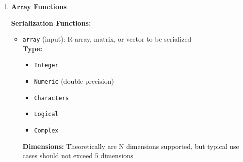 \begin{enumerate}
\begin{enumerate}
\begin{itemize}
                    \item \texttt{tox\_serialize\_logical\_array(array, filename)} -
                          Serialize N-dimensional logical array
                          
                    \item \texttt{tox\_deserialize\_logical\_array(filename)} -
                          Deserialize N-dimensional logical array
                          
                    \item \texttt{tox\_serialize\_complex\_array(array, filename)} -
                          Serialize N-dimensional complex array
                          
                    \item \texttt{tox\_deserialize\_complex\_array(filename)} -
                          Deserialize N-dimensional complex array
                  \end{itemize}
                  
            \item \textbf{Array Functions}
                  
                  \textbf{Serialization Functions:}
                  \begin{itemize}
                    \item \texttt{array} (input): R array, matrix, or vector to be serialized
                          \\ \textbf{Type:}
                          \begin{itemize}
                            \item \texttt{Integer}
                                  
                            \item \texttt{Numeric} (double precision)
                                  
                            \item \texttt{Characters}
                                  
                            \item \texttt{Logical}
                                  
                            \item \texttt{Complex}
                          \end{itemize}
                          \textbf{Dimensions:} Theoretically are N dimensions supported, but
                          typical use cases should not exceed 5 dimensions \\
                          

\end{itemize}
\end{enumerate}
\end{enumerate}
